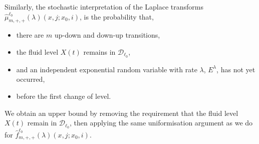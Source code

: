 Similarly, the stochastic interpretation of the Laplace transforms \(\widehat \mu^{\ell_0}_{m,+,+}(\lambda)(x,j;x_0,i)\), is the probability that, 
\begin{itemize}
	\item there are \(m\) up-down and down-up transitions, 
	\item the fluid level \(X(t)\) remains in \(\mathcal D_{\ell_0}\), 
	\item and an independent exponential random variable with rate \(\lambda\), \(E^\lambda\), has not yet occurred,
	\item before the first change of level.
\end{itemize}
We obtain an upper bound by removing the requirement that the fluid level \(X(t)\) remain in \(\mathcal D_{\ell_0}\), then applying the same uniformisation argument as we do for \(\widehat f^{\ell_0}_{m,+,+}(\lambda)(x,j;x_0,i)\).

